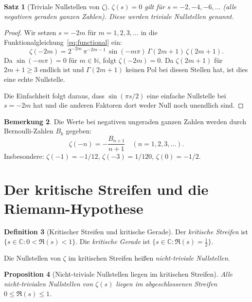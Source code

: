 \documentclass[12pt,a4paper]{amsart}
\newtheorem{theorem}{Satz}[section]
\newtheorem{proposition}[theorem]{Proposition}
\theoremstyle{definition}
\newtheorem{definition}[theorem]{Definition}
\newtheorem{remark}[theorem]{Bemerkung}
\newcommand{\N}{\mathbb{N}}
\newcommand{\C}{\mathbb{C}}
\begin{document}
\begin{theorem}[Triviale Nullstellen von $\zeta$]
\label{thm:trivial_zeros}
$\zeta(s) = 0$ gilt f\"ur $s = -2, -4, -6, \ldots$
(alle negativen geraden ganzen Zahlen).
Diese werden \emph{triviale Nullstellen} genannt.
\end{theorem}

\begin{proof}
Wir setzen $s = -2m$ f\"ur $m = 1, 2, 3, \ldots$ in die
Funktionalgleichung~\eqref{eq:functional} ein:
\[
  \zeta(-2m) = 2^{-2m}\,\pi^{-2m-1}\,\sin(-m\pi)\,\Gamma(2m+1)\,\zeta(2m+1).
\]
Da $\sin(-m\pi) = 0$ f\"ur $m \in \N$, folgt $\zeta(-2m) = 0$.
Da $\zeta(2m+1)$ f\"ur $2m+1 \ge 3$ endlich ist und $\Gamma(2m+1)$ keinen
Pol bei diesen Stellen hat, ist dies eine echte Nullstelle.

Die Einfachheit folgt daraus, dass $\sin(\pi s/2)$ eine einfache Nullstelle
bei $s = -2m$ hat und die anderen Faktoren dort weder Null noch unendlich sind.
\end{proof}

\begin{remark}
Die Werte bei negativen ungeraden ganzen Zahlen werden durch
Bernoulli-Zahlen $B_k$ gegeben:
\[
  \zeta(-n) = -\frac{B_{n+1}}{n+1} \quad (n = 1, 2, 3, \ldots).
\]
Insbesondere: $\zeta(-1) = -1/12$, $\zeta(-3) = 1/120$, $\zeta(0) = -1/2$.
\end{remark}

\section{Der kritische Streifen und die Riemann-Hypothese}

\begin{definition}[Kritischer Streifen und kritische Gerade]
\label{def:critical_strip}
Der \emph{kritische Streifen} ist $\{s \in \C : 0 < \Re(s) < 1\}$.
Die \emph{kritische Gerade} ist $\{s \in \C : \Re(s) = \tfrac{1}{2}\}$.

Die Nullstellen von $\zeta$ im kritischen Streifen hei\ss en
\emph{nicht-triviale Nullstellen}.
\end{definition}

\begin{proposition}[Nicht-triviale Nullstellen liegen im kritischen Streifen]
\label{prop:zeros_in_strip}
Alle nicht-trivialen Nullstellen von $\zeta(s)$ liegen im abgeschlossenen
Streifen $0 \le \Re(s) \le 1$.
\end{proposition}
\end{document}
